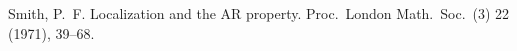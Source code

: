 \documentclass[12pt,twoside]{article}
\newcommand\arxivref[1]{\href{http://arxiv.org/abs/#1}{\tt arXiv:#1}}
\theoremstyle{plain} %
\theoremstyle{definition} %
\theoremstyle{definition} %
\numberwithin{theorem}{section}
\numberwithin{equation}{section}
\numberwithin{figure}{section}
\numberwithin{table}{section}
\begin{document}
\begin{thebibliography}{99}
Smith, P.~F.
Localization and the AR property.
Proc.\ London Math.\ Soc.\ (3) 22 (1971), 39--68.

%
%

\end{thebibliography}

\end{document}
